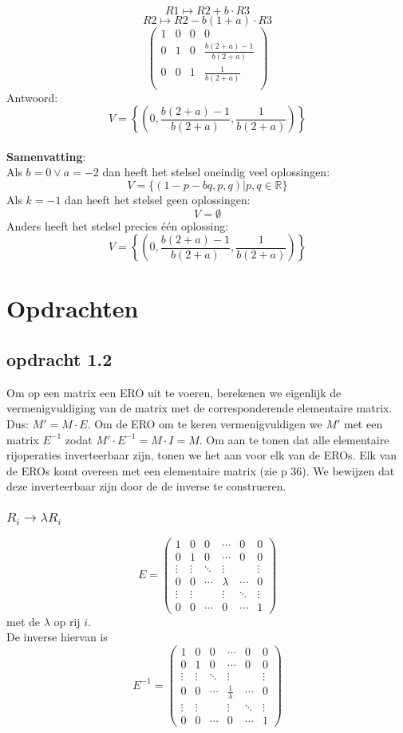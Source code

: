 \documentclass[10pt,a4paper]{article}
\begin{document}
\[ R1 \longmapsto R2 + b\cdot R3 \]
\[ R2 \longmapsto R2 - b(1+a)\cdot R3 \]
\[
\begin{pmatrix}
1 & 0 & 0 & 0\\
0 & 1 & 0 & \frac{b(2+a)-1}{b(2+a)}\\
0 & 0 & 1 & \frac{1}{b(2+a)}\\
\end{pmatrix}
\]
Antwoord:
\[
V=\left\lbrace\left(0,\frac{b(2+a)-1}{b(2+a)}, \frac{1}{b(2+a)}\right)\right\rbrace
\]\\
\textbf{Samenvatting}:\\
Als  $b=0 \vee a=-2$ dan heeft het stelsel oneindig veel oplossingen:
\[
V = \{ (1-p-bq,p,q) | p,q \in \mathbb{R} \}
\]
Als $k=-1$ dan heeft het stelsel geen oplossingen:
\[
V=\emptyset
\]
Anders heeft het stelsel precies één oplossing:
\[
V=\left\lbrace\left(0,\frac{b(2+a)-1}{b(2+a)}, \frac{1}{b(2+a)}\right)\right\rbrace
\]

\section{Opdrachten}
\subsection*{opdracht 1.2}
Om op een matrix een ERO uit te voeren, berekenen we eigenlijk de vermenigvuldiging van de matrix met de corresponderende elementaire matrix. Dus: $M' = M \cdot E$. Om de ERO om te keren vermenigvuldigen we $M'$ met een matrix $E^{-1}$ zodat $M'\cdot E^{-1} = M \cdot I = M$.
Om aan te tonen dat alle elementaire rijoperaties inverteerbaar zijn, tonen we het aan voor elk van de EROs. Elk van de EROs komt overeen met een elementaire matrix (zie p 36). We bewijzen dat deze inverteerbaar zijn door de de inverse te construeren.
\subsubsection*{$R_i\rightarrow \lambda R_i$}
\[
E=
\begin{pmatrix}
1 & 0 & 0 & \cdots & 0 & 0\\
0 & 1 & 0 & \cdots & 0 & 0\\
\vdots & \vdots & \ddots & \vdots& & \vdots\\
0 & 0 & \cdots & \lambda & \cdots & 0\\
\vdots & \vdots & & \vdots& \ddots & \vdots\\
0 & 0 & \cdots & 0 & \cdots &1
\end{pmatrix}
\]
met de $\lambda$ op rij $i$.\\
De inverse hiervan is
\[
E^{-1}=
\begin{pmatrix}
1 & 0 & 0 & \cdots & 0 & 0\\
0 & 1 & 0 & \cdots & 0 & 0\\
\vdots & \vdots & \ddots & \vdots& & \vdots\\
0 & 0 & \cdots & \frac{1}{\lambda} & \cdots & 0\\
\vdots & \vdots & & \vdots& \ddots & \vdots\\
0 & 0 & \cdots & 0 & \cdots &1
\end{pmatrix}
\]
\end{document}
